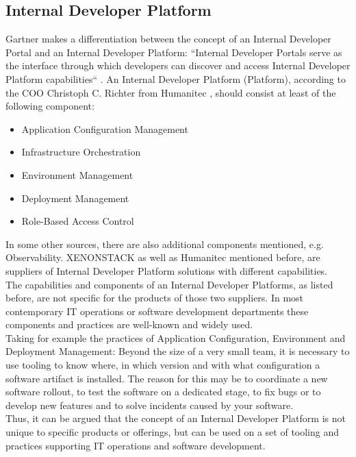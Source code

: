 \documentclass[a4paper,12pt]{article}
\begin{document}
    \subsection{Internal Developer Platform}
    \label{subsec:vpplatform}
    Gartner makes a differentiation between the concept of an Internal Developer Portal and an Internal Developer Platform:
    ``Internal Developer Portals serve as the interface through which developers can discover and
    access Internal Developer Platform capabilities``\parencite{gartner} .
    An Internal Developer Platform (Platform), according to the COO Christoph C. Richter from Humanitec\parencite{richteretal} ,
    should consist at least of the following component:
    \begin{itemize}
        \item Application Configuration Management
        \item Infrastructure Orchestration
        \item Environment Management
        \item Deployment Management
        \item Role-Based Access Control
    \end{itemize}
    In some other sources, there are also additional components mentioned, e.g. Observability\parencite{xenon}.
    XENONSTACK as well as Humanitec mentioned before, are suppliers of Internal Developer Platform solutions with
    different capabilities.\\
    The capabilities and components of an Internal Developer Platforms, as listed before,  are not specific for the products
    of those two suppliers.
    In most contemporary IT operations or software development departments these components and practices are well-known
    and widely used.\\
    Taking for example the practices of Application Configuration, Environment and Deployment Management:
    Beyond the size of a very small team, it is necessary to use tooling to know where, in which version
    and with what configuration a software artifact is installed.
    The reason for this may be to coordinate a new software rollout, to test the software on a dedicated stage, to fix bugs
    or to develop new features and to solve incidents caused by your software.\\
    Thus, it can be argued that the concept of an Internal Developer Platform is not unique to specific products
    or offerings, but can be used on a set of tooling and practices supporting IT operations and software development.
\end{document}

